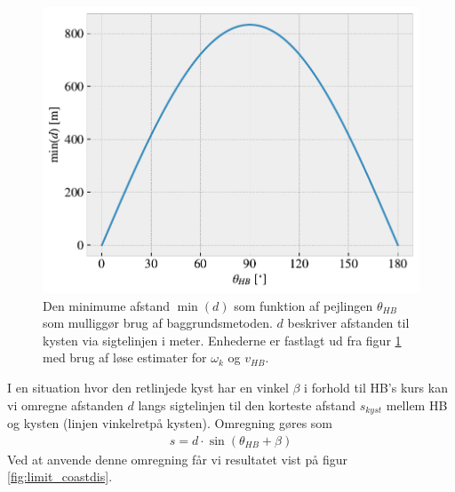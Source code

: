 \documentclass[%
 reprint,
nofootinbib,
aps,
]{revtex4-1}
\begin{document}
\begin{figure}[H]
  \includegraphics[width=\linewidth]{figures/limit_dimension.pdf}
  \caption{Den minimume afstand $\min{(d)}$ som funktion af pejlingen $\theta_{HB}$ som mulliggør brug af baggrundsmetoden. $d$ beskriver afstanden til kysten via sigtelinjen i meter. Enhederne er fastlagt ud fra figur \ref{fig:limit_dimension} med brug af løse estimater for $\omega_k$ og $v_{HB}$.}
  \label{fig:limit_dimension}
\end{figure}
I en situation hvor den retlinjede kyst har en vinkel $\beta$ i forhold til HB's kurs kan vi omregne afstanden $d$ langs sigtelinjen til den korteste afstand $s_{kyst}$ mellem HB og kysten (linjen vinkelretpå kysten). Omregning gøres som
\begin{align}
  s = d\cdot \sin{(\theta_{HB} + \beta)}
  \label{eq:s_kyst}
\end{align}
Ved at anvende denne omregning får vi resultatet vist på figur \ref{fig:limit_coastdis}.
\end{document}
